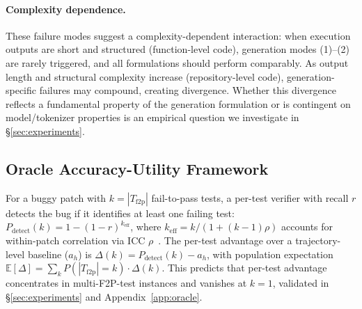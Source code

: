 \paragraph{Complexity dependence.} These failure modes suggest a complexity-dependent interaction: when execution outputs are short and structured (function-level code), generation modes (1)--(2) are rarely triggered, and all formulations should perform comparably. As output length and structural complexity increase (repository-level code), generation-specific failures may compound, creating divergence. Whether this divergence reflects a fundamental property of the generation formulation or is contingent on model/tokenizer properties is an empirical question we investigate in \S\ref{sec:experiments}.

\subsection{Oracle Accuracy-Utility Framework}
\label{sec:oracle}

For a buggy patch with $k = |T_{\text{f2p}}|$ fail-to-pass tests, a per-test verifier with recall $r$ detects the bug if it identifies at least one failing test: $P_{\text{detect}}(k) = 1 - (1 - r)^{k_{\text{eff}}}$, where $k_{\text{eff}} = k / (1 + (k-1)\rho)$ accounts for within-patch correlation via ICC $\rho$~\citep{shrout1979icc}. The per-test advantage over a trajectory-level baseline ($a_h$) is $\Delta(k) = P_{\text{detect}}(k) - a_h$, with population expectation $\mathbb{E}[\Delta] = \sum_{k} P(|T_{\text{f2p}}| = k) \cdot \Delta(k)$. This predicts that per-test advantage concentrates in multi-F2P-test instances and vanishes at $k{=}1$, validated in \S\ref{sec:experiments} and Appendix~\ref{app:oracle}.
